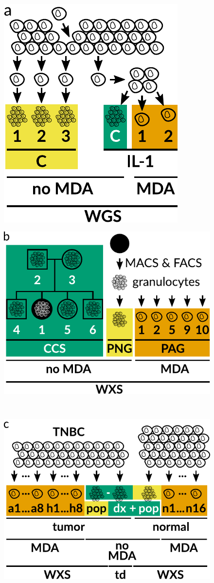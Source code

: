 \documentclass[12pt,inline]{wlscirep}
\begin{document}
\begin{figure}[!tpb]
  \begin{minipage}{.3\linewidth}
    \includegraphics[height=38ex]{figs/Dong2017_data_overview.pdf} \\
  \end{minipage}
  \hspace{6ex}
  \begin{minipage}{.5\linewidth}
    \includegraphics[height=38ex]{figs/Laehnemann2017_data_overview.pdf} \\
  \end{minipage}\\
  \begin{minipage}{.5\linewidth}
    \includegraphics[height=38ex]{figs/Wang2014_data_overview.pdf} \\

\end{minipage}
\end{figure}
\end{document}
